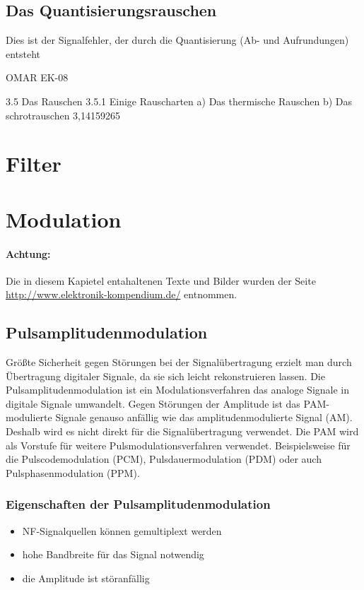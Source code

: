 \documentclass[a4paper,10pt]{article}
\begin{document}
\subsection{Das Quantisierungsrauschen}
Dies ist der Signalfehler, der durch die Quantisierung (Ab- und Aufrundungen) entsteht








\newpage
OMAR EK-08

3.5 Das Rauschen
3.5.1 Einige Rauscharten
a) Das thermische Rauschen
b) Das schrotrauschen
3,14159265

\section{Filter}




\section{Modulation}
\paragraph{Achtung:}Die in diesem Kapietel entahaltenen Texte und Bilder wurden der Seite
\url{http://www.elektronik-kompendium.de/} entnommen.

\subsection{Pulsamplitudenmodulation}
Größte Sicherheit gegen Störungen bei der Signalübertragung erzielt man durch Übertragung digitaler Signale, da sie sich 
leicht rekonstruieren lassen. Die Pulsamplitudenmodulation ist ein Modulationsverfahren das analoge Signale in digitale Signale umwandelt.
Gegen Störungen der Amplitude ist das PAM-modulierte Signale genauso anfällig wie das amplitudenmodulierte Signal (AM).
Deshalb wird es nicht direkt für die Signalübertragung verwendet. Die PAM wird als Vorstufe für weitere Pulsmodulationsverfahren verwendet.
Beispielsweise für die Pulscodemodulation (PCM), Pulsdauermodulation (PDM) oder auch Pulsphasenmodulation (PPM).
\subsubsection{Eigenschaften der Pulsamplitudenmodulation}
\begin{itemize}
 \item NF-Signalquellen können gemultiplext werden
 \item hohe Bandbreite für das Signal notwendig
 \item die Amplitude ist störanfällig
\end{itemize}
\end{document}
